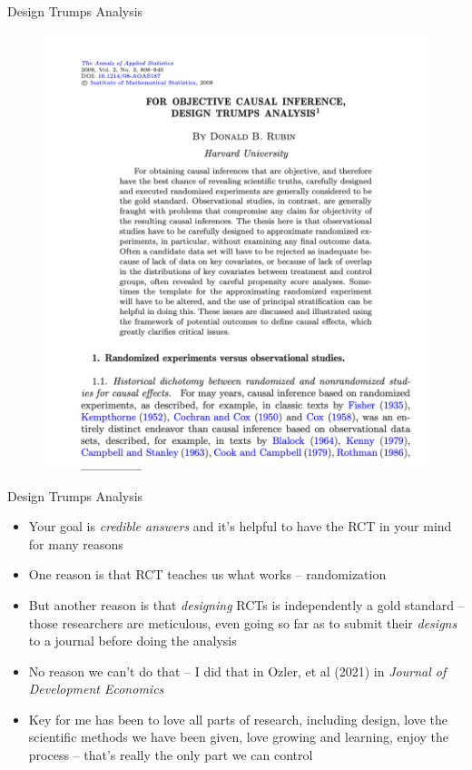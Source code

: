 \documentclass{beamer}
\begin{document}
\begin{frame}{Design Trumps Analysis}

	\begin{figure}
	\includegraphics[scale=0.3]{./lecture_includes/rubin_design_trump}
	\end{figure}

\end{frame}


\begin{frame}{Design Trumps Analysis}

\begin{itemize}

\item Your goal is \emph{credible answers} and it's helpful to have the RCT in your mind for many reasons
\item One reason is that RCT teaches us what works -- randomization
\item But another reason is that \emph{designing} RCTs is independently a gold standard -- those researchers are meticulous, even going so far as to submit their \emph{designs} to a journal before doing the analysis
\item No reason we can't do that -- I did that in Ozler, et al (2021) in \emph{Journal of Development Economics}
\item Key for me has been to love all parts of research, including design, love the scientific methods we have been given, love growing and learning, enjoy the process -- that's really the only part we can control
\end{itemize}

\end{frame}
\end{document}
